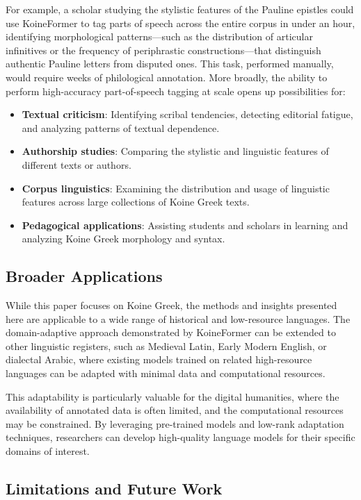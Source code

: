 \documentclass[11pt,letterpaper]{article}
\begin{document}
For example, a scholar studying the stylistic features of the Pauline epistles could use KoineFormer to tag parts of speech across the entire corpus in under an hour, identifying morphological patterns---such as the distribution of articular infinitives or the frequency of periphrastic constructions---that distinguish authentic Pauline letters from disputed ones.  This task, performed manually, would require weeks of philological annotation.  More broadly, the ability to perform high-accuracy part-of-speech tagging at scale opens up possibilities for:
\begin{itemize}
    \item \textbf{Textual criticism}: Identifying scribal tendencies, detecting editorial fatigue, and analyzing patterns of textual dependence.
    \item \textbf{Authorship studies}: Comparing the stylistic and linguistic features of different texts or authors.
    \item \textbf{Corpus linguistics}: Examining the distribution and usage of linguistic features across large collections of Koine Greek texts.
    \item \textbf{Pedagogical applications}: Assisting students and scholars in learning and analyzing Koine Greek morphology and syntax.
\end{itemize}

\subsection{Broader Applications}

While this paper focuses on Koine Greek, the methods and insights presented here are applicable to a wide range of historical and low-resource languages. The domain-adaptive approach demonstrated by KoineFormer can be extended to other linguistic registers, such as Medieval Latin, Early Modern English, or dialectal Arabic, where existing models trained on related high-resource languages can be adapted with minimal data and computational resources.

This adaptability is particularly valuable for the digital humanities, where the availability of annotated data is often limited, and the computational resources may be constrained. By leveraging pre-trained models and low-rank adaptation techniques, researchers can develop high-quality language models for their specific domains of interest.

\subsection{Limitations and Future Work}
\end{document}
